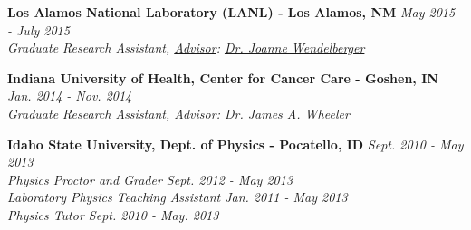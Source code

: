
\workspace
    \textbf{Los Alamos National Laboratory (LANL) - Los Alamos, NM} \hfill \textit{May 2015 - July 2015}\\
    \textit{Graduate Research Assistant, \underline{Advisor}:  \href{http://www.lanl.gov/expertise/profiles/view/joanne-wendelberger}{Dr. Joanne Wendelberger}}
    
\workspace
    \textbf{Indiana University of Health, Center for Cancer Care - Goshen, IN } \hfill \textit{Jan. 2014 - Nov. 2014}\\
    \textit{Graduate Research Assistant, \underline{Advisor}: \href{http://iuhealth.org/find-a-doctor/physician/69771/}{Dr. James A. Wheeler}}
    
\workspace
    \textbf{Idaho State University, Dept. of Physics - Pocatello, ID} \hfill \textit{Sept. 2010 - May 2013}\\
    \textit{Physics Proctor and Grader \hfill Sept. 2012 - May 2013}\\
    \textit{Laboratory Physics Teaching Assistant \hfill Jan. 2011 - May 2013}\\
    \textit{Physics Tutor \hfill Sept. 2010 - May. 2013}
    
